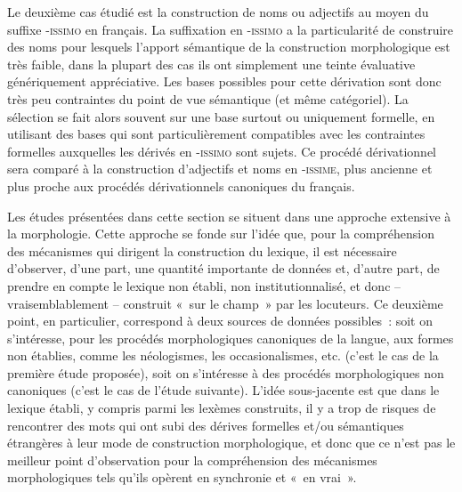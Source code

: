 \documentclass[output=paper]{langsci/langscibook}
\begin{document}
Le deuxième cas étudié est la construction de noms ou adjectifs au moyen
du suffixe -\textsc{issimo} en français. La suffixation en
-\textsc{issimo} a la particularité de construire des noms pour lesquels
l'apport sémantique de la construction morphologique est très faible,
dans la plupart des cas ils ont simplement une teinte évaluative
génériquement appréciative. Les bases possibles pour cette dérivation
sont donc très peu contraintes du point de vue sémantique (et même
catégoriel). La sélection se fait alors souvent sur une base surtout ou
uniquement formelle, en utilisant des bases qui sont particulièrement
compatibles avec les contraintes formelles auxquelles les dérivés en
-\textsc{issimo} sont sujets. Ce procédé dérivationnel sera comparé à la
construction d'adjectifs et noms en -\textsc{issime}, plus ancienne et
plus proche aux procédés dérivationnels canoniques du français.

Les études présentées dans cette section se situent dans une approche
extensive à la morphologie. Cette approche se fonde sur l'idée que, pour
la compréhension des mécanismes qui dirigent la construction du lexique,
il est nécessaire d'observer, d'une part, une quantité importante de
données et, d'autre part, de prendre en compte le lexique non établi,
non institutionnalisé, et donc -- vraisemblablement -- construit «~sur le
champ~» par les locuteurs. Ce deuxième point, en particulier, correspond
à deux sources de données possibles~: soit on s'intéresse, pour les
procédés morphologiques canoniques de la langue, aux formes non
établies, comme les néologismes, les occasionalismes, etc. (c'est le cas
de la première étude proposée), soit on s'intéresse à des procédés
morphologiques non canoniques (c'est le cas de l'étude suivante). L'idée
sous-jacente est que dans le lexique établi, y compris parmi les lexèmes
construits, il y a trop de risques de rencontrer des mots qui ont subi
des dérives formelles et/ou sémantiques étrangères à leur mode de
construction morphologique, et donc que ce n'est pas le meilleur point
d'observation pour la compréhension des mécanismes morphologiques tels
qu'ils opèrent en synchronie et «~en vrai~».
\end{document}

